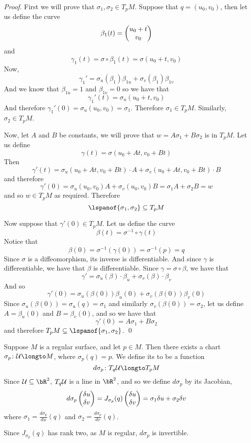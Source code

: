 \begin{proof}

    First we will prove that $\sigma_1,\sigma_2\in T_pM$.
    Suppose that $q=(u_0,v_0)$, then let us define the curve
    \[ \beta_1(t) = \begin{pmatrix}u_0+t\\v_0\end{pmatrix} \]
    and
    \[ \gamma_1(t) = \sigma\circ\beta_1(t) = \sigma(u_0+t,v_0) \]
    Now,
    \[ \gamma_1' = \sigma_u(\beta_1)\beta_{1u} + \sigma_v(\beta_1)\beta_{1v} \]
    And we know that $\beta_{1u}=1$ and $\beta_{1v}=0$ so we have that
    \[ \gamma_1'(t) = \sigma_u(u_0+t,v_0) \]
    And therefore $\gamma_1'(0)=\sigma_u(u_0,v_0)=\sigma_1$.
    Therefore $\sigma_1\in T_pM$.
    Similarly, $\sigma_2\in T_pM$.

    Now, let $A$ and $B$ be constants, we will prove that $w=A\sigma_1+B\sigma_2$ is in $T_pM$.
    Let us define
    \[ \gamma(t) = \sigma(u_0+At, v_0+Bt) \]
    Then
    \[ \gamma'(t) = \sigma_u(u_0+At, v_0+Bt)\cdot A + \sigma_v(u_0+At,v_0+Bt)\cdot B \]
    and therefore
    \[ \gamma'(0) = \sigma_u(u_0,v_0)A + \sigma_v(u_0,v_0)B = \sigma_1A + \sigma_2B = w \]
    and so $w\in T_pM$ as required.
    Therefore
    \[ \lspanof{\sigma_1,\sigma_2}\subseteq T_pM \]

    Now suppose that $\gamma'(0)\in T_pM$.
    Let us define the curve
    \[ \beta(t) = \sigma^{-1}\circ\gamma(t) \]
    Notice that
    \[ \beta(0)=\sigma^{-1}(\gamma(0)) = \sigma^{-1}(p) = q \]
    Since $\sigma$ is a diffeomorphism, its inverse is differentiable.
    And since $\gamma$ is differentiable, we have that $\beta$ is differentiable.
    Since $\gamma=\sigma\circ\beta$, we have that
    \[ \gamma' = \sigma_u(\beta)\cdot\beta_u + \sigma_v(\beta)\cdot\beta_v \]
    And so
    \[ \gamma'(0) = \sigma_u(\beta(0))\beta_u(0) + \sigma_v(\beta(0))\beta_v(0) \]
    Since $\sigma_u(\beta(0))=\sigma_u(q)=\sigma_1$ and similarly $\sigma_v(\beta(0))=\sigma_2$, let us define $A=\beta_u(0)$ and $B=\beta_v(0)$, and so we have that
    \[ \gamma'(0) = A\sigma_1 + B\sigma_2 \]
    and therefore $T_pM\subseteq\lspanof{\sigma_1,\sigma_2}$.
    \qed

\end{proof}

\begin{defn*}

    Suppose $M$ is a regular surface, and let $p\in M$.
    Then there exists a chart $\sigma_p\colon\mU\longto M$, where $\sigma_p(q)=p$.
    We define its  to be a function
    \[ d\sigma_p\colon T_q\mU\longto T_pM \]
    Since $\mU\subseteq\bR^2$, $T_q{\cal U}$ is a line in $\bR^2$, and so we define $d\sigma_p$ by its Jacobian,
    \[ d\sigma_p\begin{pmatrix}\delta u\\\delta v\end{pmatrix} = J_{\sigma_p}(q)\begin{pmatrix}\delta u\\\delta v\end{pmatrix} = \sigma_1\delta u + \sigma_2\delta v \]
    where $\sigma_1=\frac{d\sigma_p}{du}(q)$ and $\sigma_2=\frac{d\sigma_p}{dv}(q)$.

    Since $J_{\sigma_p}(q)$ has rank two, as $M$ is regular, $d\sigma_p$ is invertible.

\end{defn*}


